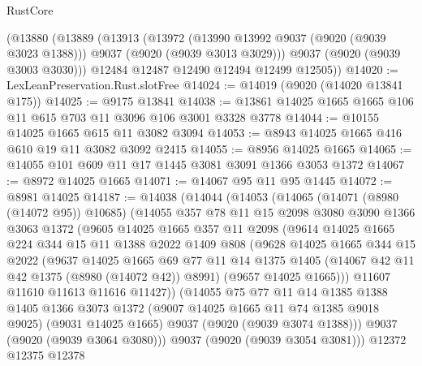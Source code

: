 \begin{lexlean}{RustCore}
\begin{coremodule}
    (@13880
      (@13889
        (@13913
          (@13972
            (@13990 @13992 @9037 (@9020 (@9039 @3023 @1388)))
            @9037
            (@9020 (@9039 @3013 @3029)))
          @9037
          (@9020 (@9039 @3003 @3030)))
        @12484
        @12487
        @12490
        @12494
        @12499
        @12505))
@14020 := LexLeanPreservation.Rust.slotFree
@14024 := @14019 (@9020 (@14020 @13841 @175))
@14025 := @9175 @13841
@14038 := @13861 @14025 @1665 @1665 @106 @11 @615 @703 @11 @3096 @106 @3001 @3328 @3778
@14044 := @10155 @14025 @1665 @615 @11 @3082 @3094
@14053 := @8943 @14025 @1665 @416 @610 @19 @11 @3082 @3092 @2415
@14055 := @8956 @14025 @1665
@14065 := @14055 @101 @609 @11 @17 @1445 @3081 @3091 @1366 @3053 @1372
@14067 := @8972 @14025 @1665
@14071 := @14067 @95 @11 @95 @1445
@14072 := @8981 @14025
@14187 := @14038
    (@14044
      (@14053
        (@14065
          (@14071 (@8980 (@14072 @95)) @10685)
          (@14055
            @357
            @78
            @11
            @15
            @2098
            @3080
            @3090
            @1366
            @3063
            @1372
            (@9605
              @14025
              @1665
              @357
              @11
              @2098
              (@9614
                @14025
                @1665
                @224
                @344
                @15
                @11
                @1388
                @2022
                @1409
                @808
                (@9628
                  @14025
                  @1665
                  @344
                  @15
                  @2022
                  (@9637
                    @14025
                    @1665
                    @69
                    @77
                    @11
                    @14
                    @1375
                    @1405
                    (@14067 @42 @11 @42 @1375 (@8980 (@14072 @42)) @8991)
                    (@9657 @14025 @1665)))
                @11607
                @11610
                @11613
                @11616
                @11427))
            (@14055
              @75
              @77
              @11
              @14
              @1385
              @1388
              @1405
              @1366
              @3073
              @1372
              (@9007 @14025 @1665 @11 @74 @1385 @9018 @9025)
              (@9031 @14025 @1665)
              @9037
              (@9020 (@9039 @3074 @1388)))
            @9037
            (@9020 (@9039 @3064 @3080)))
          @9037
          (@9020 (@9039 @3054 @3081)))
        @12372
        @12375
        @12378

\end{coremodule}
\end{lexlean}

